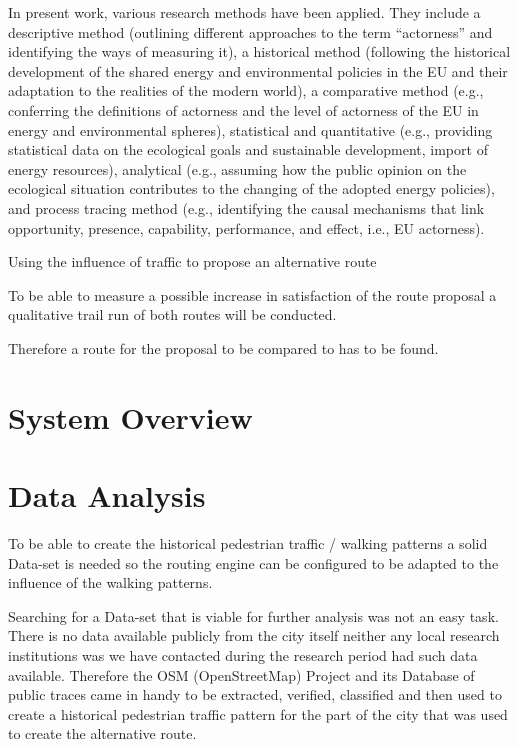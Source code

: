 In present work, various research methods have been applied. They include a descriptive method (outlining different approaches to the term “actorness” and identifying the ways of measuring it), a historical method (following the historical development of the shared energy and environmental policies in the EU and their adaptation to the realities of the modern world), a comparative method (e.g., conferring the definitions of actorness and the level of actorness of the EU in energy and environmental spheres), statistical and quantitative (e.g., providing statistical data on the ecological goals and sustainable development, import of energy resources), analytical (e.g., assuming how the public opinion on the ecological situation contributes to the changing of the adopted energy policies), and process tracing method (e.g., identifying the causal mechanisms that link opportunity, presence, capability, performance, and effect, i.e., EU actorness).


Using the influence of traffic to propose an alternative route 

To be able to measure a possible increase in satisfaction of the route proposal a qualitative trail run of both routes will be conducted.

Therefore a route for the proposal to be compared to has to be found.




\section{System Overview}





\section{Data Analysis}

To be able to create the historical pedestrian traffic / walking patterns a solid Data-set is needed so the routing engine can be configured to be adapted to the influence of the walking patterns. 

Searching for a Data-set that is viable for further analysis was not an easy task. There is no data available publicly from the city itself neither any local research institutions was we have contacted during the research period had such data available. Therefore the OSM (OpenStreetMap) Project and its Database of public traces came in handy to be extracted, verified, classified and then used to create a historical pedestrian traffic pattern for the part of the city that was used to create the alternative route.

